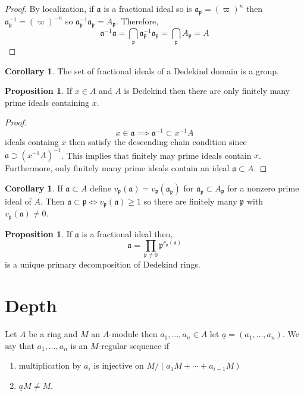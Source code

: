 \documentclass[12pt]{article}
\newcommand{\p}{\mathfrak{p}}
\renewcommand{\a}{\mathfrak{a}}
\theoremstyle{remark}
\theoremstyle{definition}
\newtheorem{proposition}[theorem]{Proposition}
\newtheorem{corollary}[theorem]{Corollary}
\newenvironment{definition}[1][Definition:]{\begin{trivlist}
\item[\hskip \labelsep {\bfseries #1}]}{\end{trivlist}}
\begin{document}
\begin{proof}
By localization, if $\a$ is a fractional ideal so is $\a_{\p} = (\varpi)^n$ then $\a^{-1}_{\p} = (\varpi)^{-n}$ so $\a^{-1}_{\p} \a_{\p} = A_{\p}$. Therefore,
\[ \a^{-1} \a = \bigcap_{\p} \a^{-1}_{\p} \a_{\p} = \bigcap_{\p} A_{\p} = A \] 
\end{proof}

\begin{corollary}
The set of fractional ideals of a Dedekind domain is a group.
\end{corollary}

\begin{proposition}
If $x \in A$ and $A$ is Dedekind then there are only finitely many prime ideals containing $x$.
\end{proposition}

\begin{proof}
\[ x \in \a \implies \a^{-1} \subset x^{-1} A \]
ideals containg $x$ then satisfy the descending chain condition since $\a \supset (x^{-1} A)^{-1}$. This implies that finitely may prime ideals contain $x$. Furthermore, only finitely many prime ideals contain an ideal $\a \subset A$. 
\end{proof}

\begin{corollary}
If $\a \subset A$ define $v_{\p}(\a) = v_{\p}(\a_{\p})$ for $\a_{\p} \subset A_{\p}$ for a nonzero prime ideal of $A$. Then $\a \subset \p \iff v_{\p}(\a) \ge 1$ so there are finitely many $\p$ with $v_{\p}(\a) \neq 0$. 
\end{corollary}

\begin{proposition}
If $\a$ is a fractional ideal then,
\[ \a = \prod_{\p \neq 0} \p^{v_{\p}(\a)} \]
is a unique primary decomposition of Dedekind rings. 
\end{proposition}

\section{Depth}

\begin{definition}
Let $A$ be a ring and $M$ an $A$-module then $a_1, \dots, a_n \in A$ let $\underline{a} = (a_1, \dots, a_n)$. We say that $a_1, \dots, a_n$ is an $M$-regular sequence if
\begin{enumerate}
\item multiplication by $a_i$ is injective on $M/(a_1 M + \cdots + a_{i-1} M)$
\item $\underline{a} M \neq M$.
\end{enumerate}
\end{definition}
\end{document}
